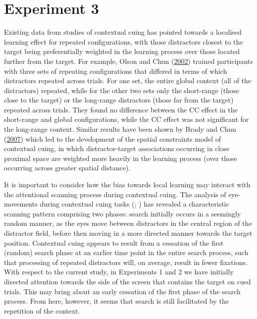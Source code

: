 \documentclass[
  man,
  floatsintext,
  longtable,
  nolmodern,
  notxfonts,
  notimes,
  colorlinks=true,linkcolor=blue,citecolor=blue,urlcolor=blue]{apa7}
\begin{document}
\section{Experiment 3}\label{experiment-3}

Existing data from studies of contextual cuing has pointed towards a
localised learning effect for repeated configurations, with those
distractors closest to the target being preferentially weighted in the
learning process over those located further from the target. For
example, Olson and Chun (\hyperref[ref-olson2002]{2002}) trained
participants with three sets of repeating configurations that differed
in terms of which distractors repeated across trials. For one set, the
entire global context (all of the distractors) repeated, while for the
other two sets only the short-range (those close to the target) or the
long-range distractors (those far from the target) repeated across
trials. They found no difference between the CC effect in the
short-range and global configurations, while the CC effect was not
significant for the long-range context. Similar results have been shown
by Brady and Chun (\hyperref[ref-brady2007]{2007}) which led to the
development of the spatial constraints model of contextual cuing, in
which distractor-target associations occurring in close proximal space
are weighted more heavily in the learning process (over those occurring
across greater spatial distance).

It is important to consider how the bias towards local learning may
interact with the attentional scanning process during contextual cuing.
The analysis of eye-movements during contextual cuing tasks
(;
) has revealed a
characteristic scanning pattern comprising two phases: search initially
occurs in a seemingly random manner, as the eyes move between
distractors in the central region of the distractor field, before then
moving in a more directed manner towards the target position. Contextual
cuing appears to result from a cessation of the first (random) search
phase at an earlier time point in the entire search process, such that
processing of repeated distractors will, on average, result in fewer
fixations. With respect to the current study, in Experiments 1 and 2 we
have initially directed attention towards the side of the screen that
contains the target on cued trials. This may bring about an early
cessation of the first phase of the search process. From here, however,
it seems that search is still facilitated by the repetition of the
context.
\end{document}
